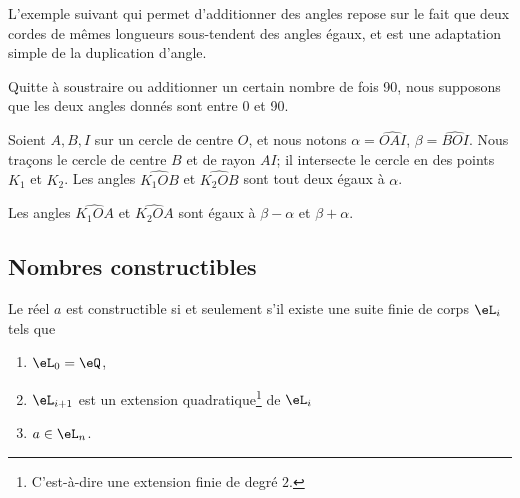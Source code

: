 L'exemple suivant qui permet d'additionner des angles repose sur le fait que deux cordes de mêmes longueurs sous-tendent des angles égaux, et est une adaptation simple de la duplication d'angle.

\begin{example}  \label{ExOVDooXnWPDl}
    Quitte à soustraire ou additionner un certain nombre de fois \unit{90}{\degree}, nous supposons que les deux angles donnés sont entre \unit{0}{\degree} et \unit{90}{\degree}.

    Soient \( A,B,I\) sur un cercle de centre \( O\), et nous notons \( \alpha=\widehat{OAI}\), \( \beta=\widehat{BOI}\). Nous traçons le cercle de centre \( B\) et de rayon \( AI\); il intersecte le cercle en des points \( K_1\) et \( K_2\). Les angles \( \widehat{K_1OB}\) et \( \widehat{K_2OB}\) sont tout deux égaux à \( \alpha\).

    Les angles \( \widehat{K_1OA}\) et \( \widehat{K_2OA}\) sont égaux à \( \beta-\alpha \) et \( \beta+\alpha\).
\end{example}

\subsection{Nombres constructibles}

\begin{theorem} \label{ThoRHFooZsLbqd}
    Le réel \( a\) est constructible si et seulement s'il existe une suite finie de corps \( \eL_i\) tels que
    \begin{enumerate}
        \item
            \( \eL_0=\eQ\),
        \item
            \( \eL_{i+1}\) est un extension quadratique\footnote{C'est-à-dire une extension finie de degré \( 2\).} de \( \eL_i\)
        \item
            \( a\in \eL_n\).
    \end{enumerate}
\end{theorem}

